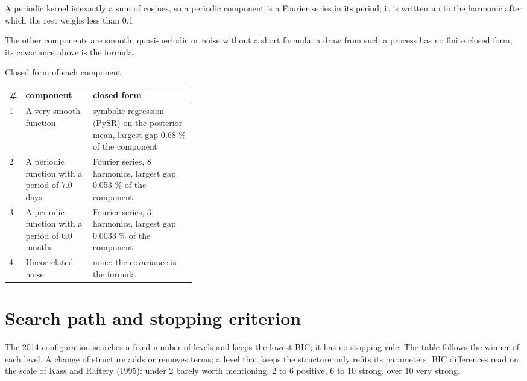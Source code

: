 \documentclass[11pt,a4paper]{article}
\begin{document}
A periodic kernel is exactly a sum of cosines, so a periodic component is a Fourier series in its period; it is written up to the harmonic after which the rest weighs less than 0.1 %

The other components are smooth, quasi-periodic or noise without a short formula: a draw from such a process has no finite closed form; its covariance above is the formula.

Closed form of each component:

\begin{center}\footnotesize
\begin{tabular}{lp{0.36\linewidth}l}
\toprule
\# & component & closed form \\
\midrule
1 & A very smooth function & symbolic regression (PySR) on the posterior mean, largest gap 0.68 \% of the component \\
2 & A periodic function with a period of 7.0 days & Fourier series, 8 harmonics, largest gap 0.053 \% of the component \\
3 & A periodic function with a period of 6.0 months & Fourier series, 3 harmonics, largest gap 0.0033 \% of the component \\
4 & Uncorrelated noise & none: the covariance is the formula \\
\bottomrule
\end{tabular}
\end{center}

\section*{Search path and stopping criterion}

The 2014 configuration searches a fixed number of levels and keeps the lowest BIC; it has no stopping rule. The table follows the winner of each level. A change of structure adds or removes terms; a level that keeps the structure only refits its parameters. BIC differences read on the scale of Kass and Raftery (1995): under 2 barely worth mentioning, 2 to 6 positive, 6 to 10 strong, over 10 very strong.
\end{document}

